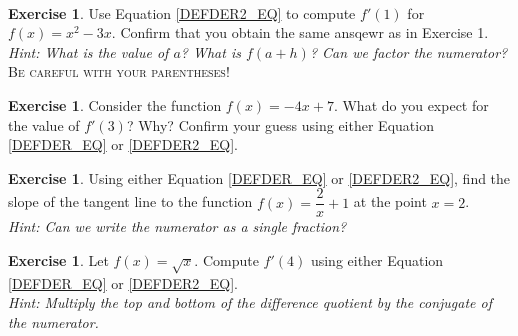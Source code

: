 \documentclass[11pt,reqno,final]{amsart}
\numberwithin{figure}{section}
\theoremstyle{definition} %
\newtheorem{exercise}[question]{Exercise}
\begin{document}
$ $

\begin{exercise}
        Use Equation \cref{DEFDER2_EQ} to compute $f'(1)$ for $f(x) = x^2-3x$.
        Confirm that you obtain the same ansqewr as in Exercise 1.\\
        \textit{Hint: What is the value of $a$? What is $f(a+h)$? Can we factor the numerator?}\\
        \textsc{Be careful with your parentheses!}       
\end{exercise}

\newpage

\begin{exercise}
        Consider the function $f(x) = -4x +7$.
        What do you expect for the value of $f'(3)$? Why?
        Confirm your guess using either Equation \cref{DEFDER_EQ} or \cref{DEFDER2_EQ}.
        \vfill
\end{exercise}

\begin{exercise}
        Using either Equation \cref{DEFDER_EQ} or \cref{DEFDER2_EQ},
        find the slope of the tangent line to the function $f(x) = \dfrac{2}{x}+1$ at the point $x = 2$.\\
        \textit{Hint: Can we write the numerator as a single fraction?}
        \vfill
\end{exercise}

\begin{exercise}
        Let $f(x) = \sqrt{x}$. Compute $f'(4)$ using either Equation \cref{DEFDER_EQ} or \cref{DEFDER2_EQ}.\\
        \textit{Hint: Multiply the top and bottom of the difference quotient by the conjugate of the numerator.}
        \vfill
\end{exercise}
\end{document}
